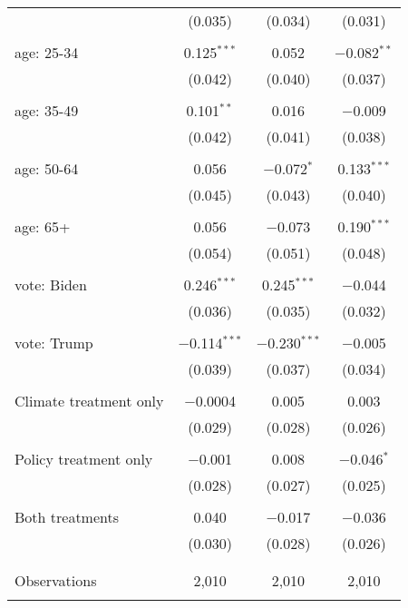 \begin{tabular}{@{\extracolsep{5pt}}lccc}
  & (0.035) & (0.034) & (0.031) \\ 
  & & & \\ 
 age: 25-34 & 0.125$^{***}$ & 0.052 & $-$0.082$^{**}$ \\ 
  & (0.042) & (0.040) & (0.037) \\ 
  & & & \\ 
 age: 35-49 & 0.101$^{**}$ & 0.016 & $-$0.009 \\ 
  & (0.042) & (0.041) & (0.038) \\ 
  & & & \\ 
 age: 50-64 & 0.056 & $-$0.072$^{*}$ & 0.133$^{***}$ \\ 
  & (0.045) & (0.043) & (0.040) \\ 
  & & & \\ 
 age: 65+ & 0.056 & $-$0.073 & 0.190$^{***}$ \\ 
  & (0.054) & (0.051) & (0.048) \\ 
  & & & \\ 
 vote: Biden & 0.246$^{***}$ & 0.245$^{***}$ & $-$0.044 \\ 
  & (0.036) & (0.035) & (0.032) \\ 
  & & & \\ 
 vote: Trump & $-$0.114$^{***}$ & $-$0.230$^{***}$ & $-$0.005 \\ 
  & (0.039) & (0.037) & (0.034) \\ 
  & & & \\ 
 Climate treatment only & $-$0.0004 & 0.005 & 0.003 \\ 
  & (0.029) & (0.028) & (0.026) \\ 
  & & & \\ 
 Policy treatment only & $-$0.001 & 0.008 & $-$0.046$^{*}$ \\ 
  & (0.028) & (0.027) & (0.025) \\ 
  & & & \\ 
 Both treatments & 0.040 & $-$0.017 & $-$0.036 \\ 
  & (0.030) & (0.028) & (0.026) \\ 
  & & & \\ 
\hline \\[-1.8ex] 

Observations & 2,010 & 2,010 & 2,010 \\ 
\hline 
\hline \\[-1.8ex] 
\end{tabular} 
